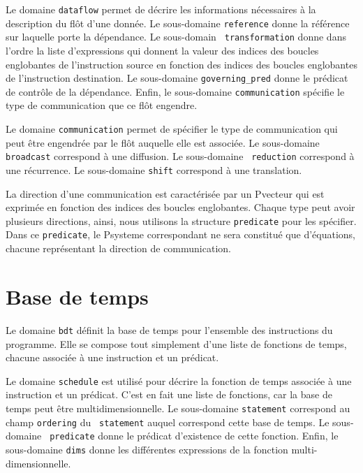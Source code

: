 \documentclass{article}
\begin{document}
{Le domaine {\tt dataflow} permet de d\'ecrire les informations n\'ecessaires 
\`a la description du fl\^ot d'une donn\'ee. Le sous-domaine {\tt reference} 
donne la r\'ef\'erence sur laquelle porte la d\'ependance. Le sous-domain {\tt 
transformation} donne dans l'ordre la liste d'expressions qui donnent la valeur
des indices des boucles englobantes de l'instruction source en fonction des 
indices des boucles englobantes de l'instruction destination. Le sous-domaine 
{\tt governing\_pred} donne le pr\'edicat de contr\^ole de la d\'ependance. 
Enfin, le sous-domaine {\tt communication} sp\'ecifie le type de communication 
que ce fl\^ot engendre.}

{Le domaine {\tt communication} permet de sp\'ecifier le type de communication 
qui peut \^etre engendr\'ee par le fl\^ot auquelle elle est associ\'ee. Le 
sous-domaine {\tt broadcast} correspond \`a une diffusion. Le sous-domaine {\tt
reduction} correspond \`a une r\'ecurrence. Le sous-domaine {\tt shift} 
correspond \`a une translation.

La direction d'une communication est caract\'eris\'ee par un Pvecteur qui est 
exprim\'ee en fonction des indices des boucles englobantes. Chaque type peut 
avoir plusieurs directions, ainsi, nous utilisons la structure {\tt predicate} 
pour les sp\'ecifier. Dans ce {\tt predicate}, le Psysteme correspondant ne 
sera constitu\'e que d'\'equations, chacune repr\'esentant la direction de 
communication.}

\section{Base de temps}

{Le domaine {\tt bdt} d\'efinit la base de temps pour l'ensemble des 
instructions du programme. Elle se compose tout simplement d'une liste de 
fonctions de temps, chacune associ\'ee \`a une instruction et un pr\'edicat.}

{Le domaine {\tt schedule} est utilis\'e pour d\'ecrire la fonction de temps 
associ\'ee \`a une instruction et un pr\'edicat. C'est en fait une liste de 
fonctions, car la base de temps peut \^etre multidimensionnelle. Le 
sous-domaine {\tt statement} correspond au champ {\tt ordering} du {\tt 
statement} auquel correspond cette base de temps. Le sous-domaine {\tt 
predicate} donne le pr\'edicat d'existence de cette fonction. Enfin, le 
sous-domaine {\tt dims} donne les diff\'erentes expressions de la fonction 
multi-dimensionnelle.}
\end{document}
